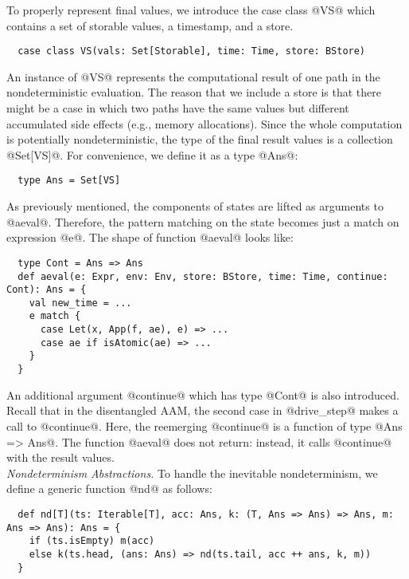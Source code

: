 \documentclass[acmsmall, review]{acmart}\settopmatter{}
\begin{document}
To properly represent final values, we introduce the case class @VS@ which
contains a set of storable values, a timestamp, and a store.

\begin{lstlisting}
  case class VS(vals: Set[Storable], time: Time, store: BStore)
\end{lstlisting}

An instance of @VS@ represents the computational result of one path in
the nondeterministic evaluation. 
The reason that we include a store is that there might be a case in which two paths
have the same values but different accumulated side effects (e.g., memory allocations).
Since the whole computation is potentially nondeterministic, the type of the final result
values is a collection @Set[VS]@. For convenience, we define it as a type @Ans@:

\begin{lstlisting}
  type Ans = Set[VS]
\end{lstlisting}

As previously mentioned, the components of states are lifted as arguments to
@aeval@. Therefore, the pattern matching on the state becomes just a match on
expression @e@. The shape of function @aeval@ looks like:

\begin{lstlisting}
  type Cont = Ans => Ans
  def aeval(e: Expr, env: Env, store: BStore, time: Time, continue: Cont): Ans = {
    val new_time = ...
    e match {
      case Let(x, App(f, ae), e) => ...
      case ae if isAtomic(ae) => ...
    }
  }
\end{lstlisting}

An additional argument @continue@ which has type @Cont@ is also introduced.
Recall that in the disentangled AAM, the second case in @drive_step@
makes a call to @continue@. Here, the reemerging @continue@ is a function
of type @Ans => Ans@. The function @aeval@ does not return: instead, it calls
@continue@ with the result values. \\

\textit{Nondeterminism Abstractions.}
To handle the inevitable nondeterminism, we define a generic function @nd@ as follows:

\begin{lstlisting}
  def nd[T](ts: Iterable[T], acc: Ans, k: (T, Ans => Ans) => Ans, m: Ans => Ans): Ans = {
    if (ts.isEmpty) m(acc)
    else k(ts.head, (ans: Ans) => nd(ts.tail, acc ++ ans, k, m))
  }
\end{lstlisting}
\end{document}
